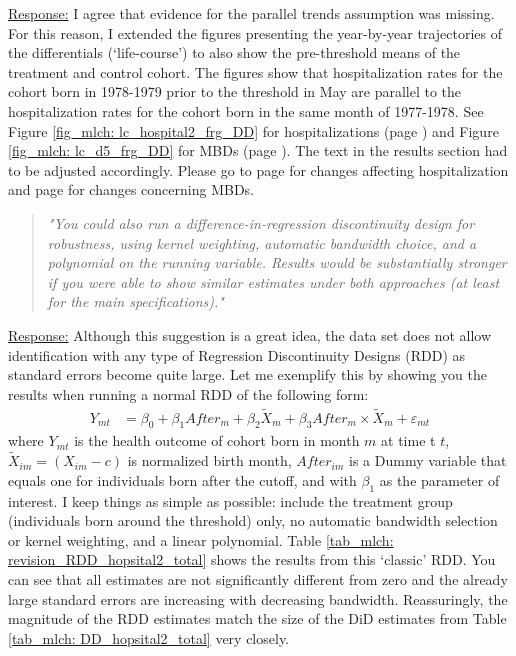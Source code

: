 \underline{Response:} I agree that evidence for the parallel trends assumption was missing. For this reason, I extended the figures presenting the year-by-year trajectories of the differentials (`life-course') to also show the pre-threshold means of the treatment and control cohort. The figures show that hospitalization rates for the cohort born in 1978-1979 prior to the threshold in May are parallel to the hospitalization rates for the cohort born in the same month of 1977-1978. See Figure \ref{fig_mlch: lc_hospital2_frg_DD} for hospitalizations (page \pageref{fig_mlch: lc_hospital2_frg_DD}) and Figure \ref{fig_mlch: lc_d5_frg_DD} for MBDs (page \pageref{fig_mlch: lc_d5_frg_DD}). The text in the results section had to be adjusted accordingly. Please go to page \pageref{rev_mlch: editor_parallel_trends_text} for changes affecting hospitalization and page \pageref{rev_mlch: editor_parallel_trends_text_d5} for changes concerning MBDs.





\bigskip
\begin{quote}
	\textit{"You could also run a difference-in-regression discontinuity design for robustness, using kernel weighting, automatic bandwidth choice, and a polynomial on the running variable. Results would be substantially stronger if you were able to show similar estimates under both approaches (at least for the main specifications)."}
\end{quote}
\underline{Response:}
Although this suggestion is a great idea, the data set does not allow identification with any type of Regression Discontinuity Designs (RDD) as standard errors become quite large. Let me exemplify this by showing you the results when running a normal RDD of the following form: 
\begin{align}
Y_{mt} &= \beta_0 + \beta_1 After_{m} + \beta_2 \tilde X_{m} + \beta_3 After_{m} \times \tilde X_{m} + \varepsilon_{mt} \label{eq:RD}
\end{align}
where $Y_{mt}$ is the health outcome of cohort born in month $m$ at time t $t$, $\tilde X_{im}=(X_{im}-c)$ is normalized birth month, $After_{im}$ is a Dummy variable that equals one for individuals born after the cutoff, and with $\beta_1$ as the parameter of interest. I keep things as simple as possible: include the treatment group (individuals born around the threshold) only, no automatic bandwidth selection or kernel weighting, and a linear polynomial. Table \ref{tab_mlch: revision_RDD_hopsital2_total} shows the results from this `classic' RDD. You can see that all estimates are not significantly different from zero and the already large standard errors are increasing with decreasing bandwidth. Reassuringly, the magnitude of the RDD estimates match the size of the DiD estimates from Table \ref{tab_mlch: DD_hopsital2_total} very closely. 


